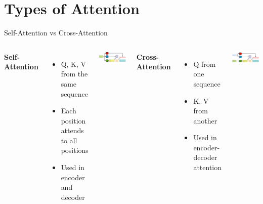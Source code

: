\documentclass[serif, aspectratio=169]{beamer}
\begin{document}
\section{Types of Attention}
\begin{frame}{Self-Attention vs Cross-Attention}
    \begin{columns}
        \textbf{Self-Attention}
        \begin{itemize}
            \item Q, K, V from the same sequence
            \item Each position attends to all positions
            \item Used in encoder and decoder
        \end{itemize}
        \vspace{0.5em}
        \includegraphics[width=\textwidth]{pic/self-attention.png}
        
        \textbf{Cross-Attention}
        \begin{itemize}
            \item Q from one sequence
            \item K, V from another
            \item Used in encoder-decoder attention
        \end{itemize}
        \vspace{0.5em}
        \includegraphics[width=\textwidth]{pic/cross-attention.png}
    \end{columns}
\end{frame}
\end{document}
